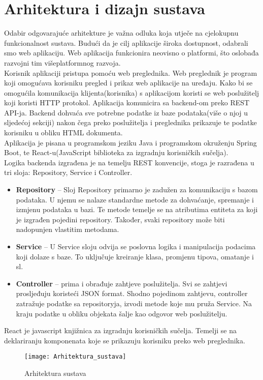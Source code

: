 \chapter{Arhitektura i dizajn sustava}
			
			
			Odabir odgovarajuće arhitekture je važna odluka koja utječe na cjelokupnu funkcionalnost sustava. Budući da je cilj aplikacije široka dostupnost, odabrali smo web aplikaciju. Web aplikacija funkcionira neovisno o platformi, što oslobađa razvojni tim višeplatformnog razvoja.\\
			Korisnik aplikaciji pristupa pomoću web preglednika. Web preglednik je program koji omogućava korisniku pregled i prikaz web aplikacije na uređaju. Kako bi se omogućila komunikacija klijenta(korisnika) s aplikacijom koristi se web poslužitelj koji koristi HTTP protokol. Aplikacija komunicira sa backend-om preko REST API-ja. Backend dohvaća sve potrebne podatke iz baze podataka(više o njoj u sljedećoj sekciji) nakon čega preko poslužitelja i preglednika prikazuje te podatke korisniku u obliku HTML dokumenta.\\
			Aplikacija je pisana u programskom jeziku Java i programskom okruženju Spring Boot, te React-u(JavaScript biblioteka za izgradnju korisničkih sučelja).\\
			
Logika backenda izgrađena je na temelju REST konvencije, stoga je razrađena u tri sloja: Repository, Service i Controller. 
			\begin{itemize}
				\item \textbf{Repository} – Sloj Repository primarno je zadužen za komunikaciju s bazom podataka. U njemu se nalaze standardne metode za dohvaćanje, spremanje i izmjenu podataka u bazi. Te metode temelje se na atributima entiteta za koji je izgrađen pojedini repository. Također, svaki repository može biti nadopunjen vlastitim metodama.
				\item \textbf{Service} – U Service sloju odvija se poslovna logika i manipulacija podacima koji dolaze s baze. To uključuje kreiranje klasa, promjenu tipova, omatanje i sl. 
				\item \textbf{Controller} –  prima i obrađuje zahtjeve poslužitelja. Svi se zahtjevi prosljeđuju koristeći JSON format. Shodno pojedinom zahtjevu, controller zatražuje podatke sa repositoryja, izvodi metode koje mu pruža Service. Na kraju podatke u obliku objekata šalje kao odgovor web poslužitelju.  
			\end{itemize}
			React je javascript knjižnica za izgradnju korisničkih sučelja. Temelji se na deklariranju komponenata koje se prikazuju korisniku preko web preglednika.
			\begin{figure}
				\texttt{[image: Arhitektura\_sustava]}
				\caption{Arhitektura sustava}
			\end{figure}
			
